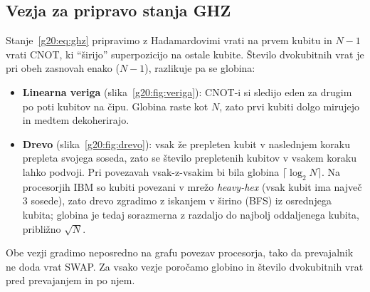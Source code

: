 \subsection{Vezja za pripravo stanja GHZ}
\label{g20:sec:vezja}

Stanje~\eqref{g20:eq:ghz} pripravimo z Hadamardovimi vrati na prvem kubitu in $N-1$ vrati CNOT, ki \enquote{širijo}
superpozicijo na ostale kubite. Število dvokubitnih vrat je pri obeh zasnovah enako ($N-1$), razlikuje pa se globina:

\begin{itemize}
\item \textbf{Linearna veriga} (slika~\ref{g20:fig:veriga}): CNOT-i si sledijo eden za drugim po poti kubitov na čipu.
      Globina raste kot $N$, zato prvi kubiti dolgo mirujejo in medtem dekoherirajo.
\item \textbf{Drevo} (slika~\ref{g20:fig:drevo}): vsak že prepleten kubit v naslednjem koraku prepleta svojega soseda, zato
      se število prepletenih kubitov v vsakem koraku lahko podvoji. Pri povezavah vsak-z-vsakim bi bila globina
      $\lceil\log_2 N\rceil$. Na procesorjih IBM so kubiti povezani v mrežo \emph{heavy-hex} (vsak kubit ima največ 3 sosede),
      zato drevo zgradimo z iskanjem v širino (BFS) iz osrednjega kubita; globina je tedaj sorazmerna z razdaljo do
      najbolj oddaljenega kubita, približno $\sqrt{N}$.
\end{itemize}
Obe vezji gradimo neposredno na grafu povezav procesorja, tako da prevajalnik ne doda vrat SWAP. Za vsako vezje poročamo
globino in število dvokubitnih vrat pred prevajanjem in po njem.

